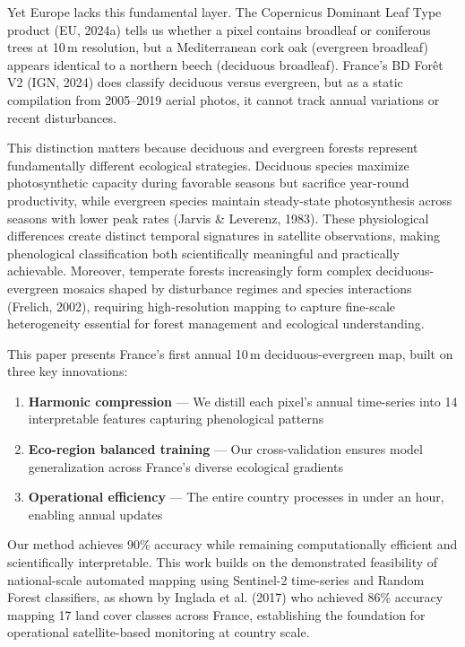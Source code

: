 \documentclass[utf8]{FrontiersinHarvard}
\begin{document}
Yet Europe lacks this fundamental layer. The Copernicus Dominant Leaf Type product (EU, 2024a) tells us whether a pixel contains broadleaf or coniferous trees at 10\,m resolution, but a Mediterranean cork oak (evergreen broadleaf) appears identical to a northern beech (deciduous broadleaf). France's BD Forêt V2 (IGN, 2024) does classify deciduous versus evergreen, but as a static compilation from 2005–2019 aerial photos, it cannot track annual variations or recent disturbances.

This distinction matters because deciduous and evergreen forests represent fundamentally different ecological strategies. Deciduous species maximize photosynthetic capacity during favorable seasons but sacrifice year-round productivity, while evergreen species maintain steady-state photosynthesis across seasons with lower peak rates (Jarvis \& Leverenz, 1983). These physiological differences create distinct temporal signatures in satellite observations, making phenological classification both scientifically meaningful and practically achievable. Moreover, temperate forests increasingly form complex deciduous-evergreen mosaics shaped by disturbance regimes and species interactions (Frelich, 2002), requiring high-resolution mapping to capture fine-scale heterogeneity essential for forest management and ecological understanding.

This paper presents France's first annual 10\,m deciduous-evergreen map, built on three key innovations:
\begin{enumerate}
    \item \textbf{Harmonic compression} — We distill each pixel's annual time-series into 14 interpretable features capturing phenological patterns
    \item \textbf{Eco-region balanced training} — Our cross-validation ensures model generalization across France's diverse ecological gradients
    \item \textbf{Operational efficiency} — The entire country processes in under an hour, enabling annual updates
\end{enumerate}

Our method achieves 90\% accuracy while remaining computationally efficient and scientifically interpretable. This work builds on the demonstrated feasibility of national-scale automated mapping using Sentinel-2 time-series and Random Forest classifiers, as shown by Inglada et al. (2017) who achieved 86\% accuracy mapping 17 land cover classes across France, establishing the foundation for operational satellite-based monitoring at country scale.
\end{document}
